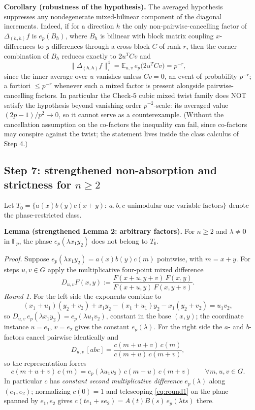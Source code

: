 \documentclass[11pt]{article}
\begin{document}
\textbf{Corollary (robustness of the hypothesis).} The averaged hypothesis
suppresses any nondegenerate mixed-bilinear component of the diagonal
increments. Indeed, if for a direction $h$ the only non-pairwise-cancelling
factor of $\Delta_{(h,h)}f$ is $e_p(B_h)$, where $B_h$ is bilinear with block
matrix coupling $x$-differences to $y$-differences through a cross-block $C$
of rank $r$, then the corner combination of $B_h$ reduces exactly to
$2u^{T}Cv$ and
\[
\bigl\|\Delta_{(h,h)}f\bigr\|_\square^4
=\mathbb{E}_{u,v}\,e_p\bigl(2u^{T}Cv\bigr)=p^{-r},
\]
since the inner average over $u$ vanishes unless $Cv=0$, an event of
probability $p^{-r}$; a fortiori $\le p^{-r}$ whenever such a mixed factor is
present alongside pairwise-cancelling factors. In particular the Check-$5$
cubic mixed twist family does NOT satisfy the hypothesis beyond vanishing
order $p^{-2}$-scale: its averaged value $(2p-1)/p^{2}\to0$, so it cannot
serve as a counterexample. (Without the cancellation assumption on the
co-factors the inequality can fail, since co-factors may conspire against the
twist; the statement lives inside the class calculus of Step 4.)

\subsection{Step 7: strengthened non-absorption and strictness for $n\ge2$}
Let $T_0=\{a(x)b(y)c(x+y):\ a,b,c \text{ unimodular one-variable factors}\}$
denote the phase-restricted class.

\textbf{Lemma (strengthened Lemma 2: arbitrary factors).} For $n\ge2$ and
$\lambda\neq0$ in $\mathbb{F}_p$, the phase $e_p(\lambda x_1y_2)$ does not
belong to $T_0$.

\emph{Proof.} Suppose $e_p(\lambda x_1y_2)=a(x)b(y)c(m)$ pointwise, with
$m=x+y$. For steps $u,v\in G$ apply the multiplicative four-point mixed
difference
\[
D_{u,v}F(x,y):=\frac{F(x+u,y+v)\,F(x,y)}{F(x+u,y)\,F(x,y+v)} .
\]
\emph{Round 1.} For the left side the exponents combine to
\[
(x_1{+}u_1)(y_2{+}v_2)+x_1y_2-(x_1{+}u_1)y_2-x_1(y_2{+}v_2)=u_1v_2 ,
\]
so $D_{u,v}\,e_p(\lambda x_1y_2)=e_p(\lambda u_1v_2)$, constant in the base
$(x,y)$; the coordinate instance $u=e_1$, $v=e_2$ gives the constant
$e_p(\lambda)$. For the right side the $a$- and $b$-factors cancel pairwise
identically and
\[
D_{u,v}\,[abc]=\frac{c(m+u+v)\,c(m)}{c(m+u)\,c(m+v)},
\]
so the representation forces
\begin{equation}\label{eq:round1}
c(m+u+v)\,c(m)=e_p(\lambda u_1v_2)\,c(m+u)\,c(m+v)
\qquad\forall m,u,v\in G .
\end{equation}
In particular $c$ has \emph{constant second multiplicative difference}
$e_p(\lambda)$ along $(e_1,e_2)$; normalizing $c(0)=1$ and telescoping
\eqref{eq:round1} on the plane spanned by $e_1,e_2$ gives
$c(te_1+se_2)=A(t)B(s)\,e_p(\lambda ts)$ there.
\end{document}
